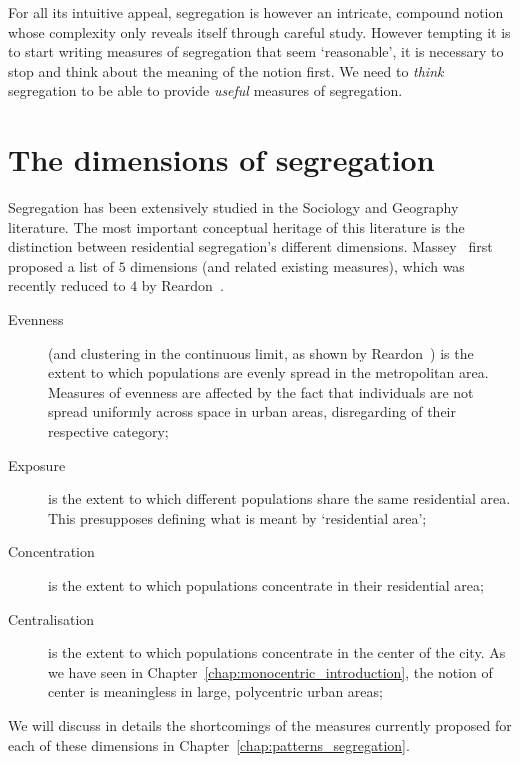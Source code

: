 For all its intuitive appeal, segregation is however an intricate, compound
notion whose complexity only reveals itself through careful study. However
tempting it is to start writing measures of segregation that seem `reasonable',
it is necessary to stop and think about the meaning of the notion first. We need to
\emph{think} segregation to be able to provide \emph{useful} measures of
segregation.


\section{The dimensions of segregation}
\label{sec:the_dimensions_of_segregation}

Segregation has been extensively studied in the Sociology and Geography
literature. The most important conceptual heritage of this literature is the
distinction between residential segregation's different dimensions.
Massey~\cite{Massey:1988} first proposed a list of $5$ dimensions (and related
existing measures), which was recently reduced to $4$ by
Reardon~\cite{Reardon:2004}. 

\begin{description}
    \item[Evenness] (and clustering in the continuous
        limit, as shown by Reardon~\cite{Reardon:2004}) is the extent to which
        populations are evenly spread in the metropolitan area.
        Measures of evenness are affected by the fact that
        individuals are not spread uniformly across space in urban areas,
        disregarding of their respective category;

    \item[Exposure] is the extent to which different
        populations share the same residential area. This presupposes defining
        what is meant by `residential area';

    \item[Concentration] is the extent to which populations concentrate in their
        residential area;

    \item[Centralisation] is the extent to which populations concentrate in the
        center of the city. As we have seen in
        Chapter~\ref{chap:monocentric_introduction}, the notion of center
        is meaningless in large, polycentric urban areas;
\end{description}

We will discuss in details the shortcomings of the measures currently proposed
for each of these dimensions in Chapter~\ref{chap:patterns_segregation}.


